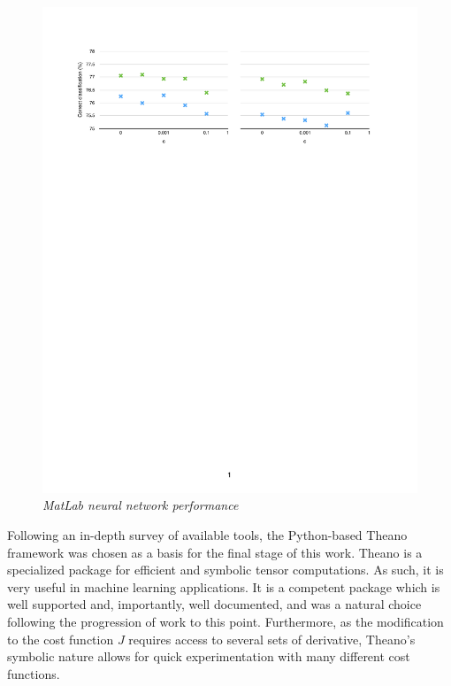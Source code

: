 \documentclass          {article} %
\begin{document}
\begin                  {figure}
\begin                  {center}
\includegraphics        [scale = 0.6]
                        {fig2.pdf}
\caption                {\small\textit{MatLab neural network performance}}%
\label                  {fig:fig2}
\end                    {center}
\end                    {figure}

Following an in-depth survey of available tools, the Python-based Theano framework was chosen as a basis for the final stage of this work. Theano is a specialized package for efficient and symbolic tensor computations. As such, it is very useful in machine learning applications. It is a competent package which is well supported and, importantly, well documented, and was a natural choice following the progression of work to this point. Furthermore, as the modification to the cost function $J$ requires access to several sets of derivative, Theano's symbolic nature allows for quick experimentation with many different cost functions.
\end{document}
